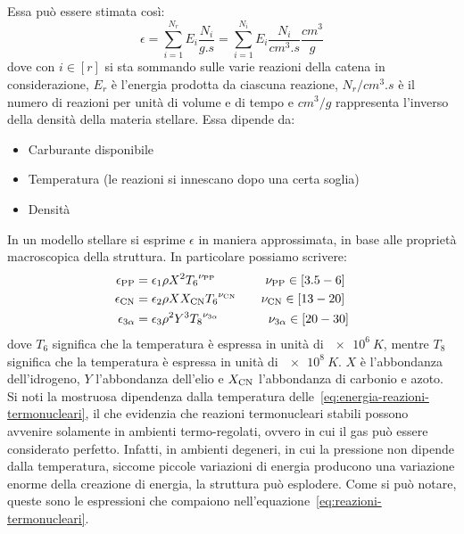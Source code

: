 Essa può essere stimata così:
\begin{equation}
    \epsilon = \sum_{i=1}^{N_r} E_i \dfrac{N_i}{\si{g.s}} = \sum_{i=1}^{N_i} E_i \dfrac{N_i}{\si{cm^3.s}} \dfrac{\si{cm^3}}{\si{g}}
\end{equation}
dove con $i \in [r]$ si sta sommando sulle varie reazioni della catena in considerazione, $E_r$ è l'energia prodotta da ciascuna reazione, $N_r/\si{cm^3.s}$ è il numero di reazioni per unità di volume e di tempo e $\si{cm^3} / \si{g}$ rappresenta l'inverso della densità della materia stellare. Essa dipende da:
\begin{itemize}
    \item Carburante disponibile
    \item Temperatura (le reazioni si innescano dopo una certa soglia)
    \item Densità
\end{itemize}

In un modello stellare si esprime $\epsilon$ in maniera approssimata, in base alle proprietà macroscopica della struttura. In particolare possiamo scrivere:
\begin{subequations}
\label{eq:energia-reazioni-termonucleari}
\begin{align}
\epsilon_\textup{PP} &= \epsilon_1 \rho X^2 {T_6}^{\nu_\textup{PP}} \qquad \qquad \nu_\textup{PP} \in [3.5 - 6] \label{eq:energia-PP}\\
\epsilon_\textup{CN} &= \epsilon_2 \rho X X_\textup{CN} {T_6}^{\nu_\textup{CN}} \qquad \nu_\textup{CN} \in [13 - 20] \label{eq:energia-CN}\\
\epsilon_{3\alpha} &= \epsilon_3 \rho^2 Y^3 {T_8}^{\nu_{3\alpha}} \qquad \qquad \nu_{3 \alpha} \in [20 - 30] \label{eq:energia-3A}
\end{align}
\end{subequations}
dove $T_6$ significa che la temperatura è espressa in unità di $\SI{e6}{K}$, mentre $T_8$ significa che la temperatura è espressa in unità di $\SI{e8}{K}$. $X$ è l'abbondanza dell'idrogeno, $Y$ l'abbondanza dell'elio e $X_\textup{CN}$ l'abbondanza di carbonio e azoto. Si noti la mostruosa dipendenza dalla temperatura delle~\eqref{eq:energia-reazioni-termonucleari}, il che evidenzia che reazioni termonucleari stabili possono avvenire solamente in ambienti termo-regolati, ovvero in cui il gas può essere considerato perfetto. Infatti, in ambienti degeneri, in cui la pressione non dipende dalla temperatura, siccome piccole variazioni di energia producono una variazione enorme della creazione di energia, la struttura può esplodere. Come si può notare, queste sono le espressioni che compaiono nell'equazione~\eqref{eq:reazioni-termonucleari}. 


